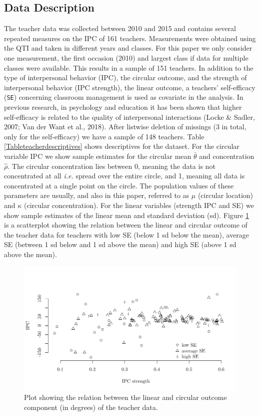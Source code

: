 \documentclass[man]{apa6}
\DeclareRobustCommand{\VANDER}[3]{#2}
\begin{document}
\subsection{Data Description}\label{DataDescriptives}

The teacher data was collected between 2010 and 2015 and contains several
repeated measures on the IPC of 161 teachers. Measurements were obtained using
the QTI and taken in different years and classes. For this paper we only
consider one measurement, the first occasion (2010) and largest class if data
for multiple classes were available. This results in a sample of 151 teachers.
In addition to the type of interpersonal behavior (IPC), the circular outcome,
and the strength of interpersonal behavior (IPC strength), the linear outcome, a
teachers' self-efficacy (\verb|SE|) concerning classroom management is used as
covariate in the analysis. In previous research, in psychology and education it
has been shown that higher self-efficacy is related to the quality of
interpersonal interactions (Locke \& Sadler, 2007; \VANDER{Want}{Van der}{van der} Want et al., 2018).
After listwise deletion of missings (\(3\) in total, only for the self-efficacy)
we have a sample of 148 teachers. Table \ref{Tableteacherdescriptives} shows
descriptives for the dataset. For the circular variable IPC we show sample
estimates for the circular mean \(\bar{\theta}\) and concentration \(\hat{\rho}\).
The circular concentration lies between 0, meaning the data is not concentrated
at all \emph{i.e.} spread over the entire circle, and 1, meaning all data is
concentrated at a single point on the circle. The population values of these
parameters are usually, and also in this paper, referred to as \(\mu\) (circular
location) and \(\kappa\) (circular concentration). For the linear variables
(strength IPC and SE) we show sample estimates of the linear mean and standard
deviation (sd). Figure \ref{dataplot} is a scatterplot showing the relation between
the linear and circular outcome of the teacher data for teachers with low SE
(below 1 sd below the mean), average SE (between 1 sd below and 1 sd above the
mean) and high SE (above 1 sd above the mean).

\begin{figure}
\centering
\includegraphics[width = \textwidth]{Plots/dataplot.pdf}
\caption{Plot showing the relation between the linear and circular outcome component (in degrees) of the teacher data.}
\label{dataplot}
\end{figure}
\end{document}
